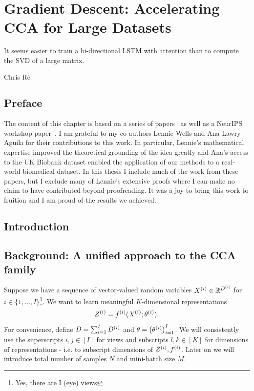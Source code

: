 \graphicspath{{chapters/gradient_descent/}}
\chapter{Gradient Descent: Accelerating CCA for Large Datasets}\label{chap:gradient_descent}
\epigraph{It seems easier to train a bi-directional LSTM with attention than to compute the SVD of a large matrix.\cite{gemp}}{Chris Ré}
\minitoc
\section*{Preface}
The content of this chapter is based on a series of papers~\citep{chapman2022generalized, chapman2023efficient} as well as a NeurIPS workshop paper~\citep{chapman2023neurips}.
I am grateful to my co-authors Lennie Wells and Ana Lawry Aguila for their contributions to this work.
In particular, Lennie's mathematical expertise improved the theoretical grounding of the idea greatly and Ana's access to the UK Biobank dataset enabled the application of our methods to a real-world biomedical dataset.
In this thesis I include much of the work from these papers, but I exclude many of Lennie's extensive proofs where I can make no claim to have contributed beyond proofreading.
It was a joy to bring this work to fruition and I am proud of the results we achieved.

\section{Introduction}

\section{Background: A unified approach to the CCA family}\label{sec:background-unified}

Suppose we have a sequence of vector-valued random variables $X^{(i)} \in \mathbb{R}^{D^{(i)}}$ for $i \in \{1, \dots, I \}$\footnote{Yes, there are I (eye) views}.
We want to learn meaningful $K$-dimensional representations
\begin{equation}\label{eq:general-form-of-representations}
    Z^{(i)} = f^{(i)}( X^{(i)}; \theta^{(i)}).
\end{equation}
For convenience, define $D = \sum_{i=1}^I D^{(i)}$ and $\theta = \left(\theta^{(i)}\right)_{i=1}^I$.
We will consistently use the superscripts $i,j \in [I]$ for views
and subscripts $l,k \in [K]$ for dimensions of representations - i.e. to subscript dimensions of $Z^{(i)}, f^{(i)}$.
Later on we will introduce total number of samples $N$ and mini-batch size $M$.

